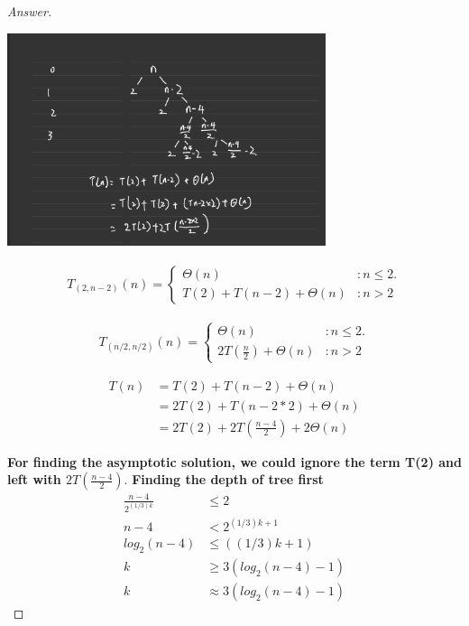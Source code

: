 \documentclass[11pt]{article}
\theoremstyle{definition}
\theoremstyle{definition}
\theoremstyle{definition}
\begin{document}
\begin{proof}[Answer]
\begin{center}
\includegraphics[width=0.7\textwidth]{IMG_0508.PNG}
\end{center}


\begin{align*}
T_{(2,n-2)}(n) = \begin{cases}
\Theta(n)& : n \leq 2.\\
T(2) + T(n-2) +\Theta(n)& : n > 2 
\end{cases}
\end{align*}

\begin{align*}
T_{(n/2,n/2)}(n) = \begin{cases}
\Theta(n)& : n \leq 2.\\
2T(\frac{n}{2}) + \Theta(n) & : n > 2 
\end{cases}
\end{align*}

\begin{align*}
T(n) &= T(2) + T(n-2) + \Theta(n)\\
&= 2T(2) + T(n-2*2) + \Theta(n)\\
&= 2T(2) + 2T(\frac{n-4}{2}) +2\Theta(n)
\end{align*}

\textbf{For finding the asymptotic solution, we could ignore the term T(2) and left with $2T(\frac{n-4}{2}).$}
\textbf{Finding the depth of tree first}
\begin{align*}
\frac{n-4}{2^{(1/3)k}} & \leq 2\\
n-4 &< 2^{(1/3)k+1}\\
log_2\left(n-4\right) &\leq ((1/3)k+1)\\
k &\geq 3 (log_2\left(n-4\right)-1)\\
k &\approx   3 (log_2\left(n-4\right)-1)
\end{align*}


\end{proof}
\end{document}
